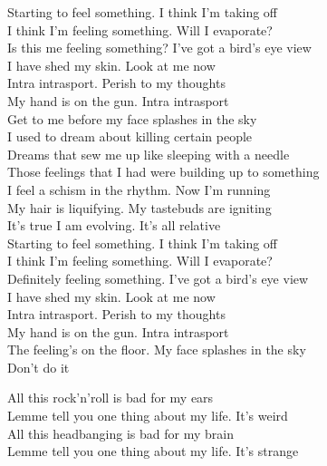 Starting to feel something. I think I'm taking off \\
I think I'm feeling something. Will I evaporate? \\
Is this me feeling something? I've got a bird's eye view \\
I have shed my skin. Look at me now \\

Intra intrasport. Perish to my thoughts \\
My hand is on the gun. Intra intrasport \\
Get to me before my face splashes in the sky \\

I used to dream about killing certain people \\
Dreams that sew me up like sleeping with a needle \\
Those feelings that I had were building up to something \\
I feel a schism in the rhythm. Now I'm running \\

My hair is liquifying. My tastebuds are igniting \\
It's true I am evolving. It's all relative \\

Starting to feel something. I think I'm taking off \\
I think I'm feeling something. Will I evaporate? \\
Definitely feeling something. I've got a bird's eye view \\
I have shed my skin. Look at me now \\

Intra intrasport. Perish to my thoughts \\
My hand is on the gun. Intra intrasport \\
The feeling's on the floor. My face splashes in the sky \\

Don't do it \\




All this rock'n'roll is bad for my ears \\
Lemme tell you one thing about my life. It's weird \\
All this headbanging is bad for my brain \\
Lemme tell you one thing about my life. It's strange \\

